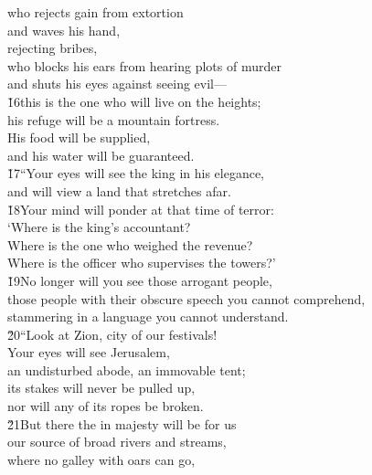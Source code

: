 \begin{poetry}
\poemll    who rejects gain from extortion \\
\poeml and waves his hand, \\
\poemll    rejecting bribes, \\
\poemll    who blocks his ears from hearing plots of murder \\
\poemlll       and shuts his eyes against seeing evil--- \\
\poeml \v{16}this is the one who will live on the heights; \\
\poemll    his refuge will be a mountain fortress. \\
\poeml His food will be supplied, \\
\poemll    and his water will be guaranteed. \\
\poeml \v{17}``Your eyes will see the king in his elegance, \\
\poemll    and will view a land that stretches afar. \\
\poeml \v{18}Your mind will ponder at that time of terror: \\
\poemll    `Where is the king's accountant? \\
\poeml Where is the one who weighed the revenue? \\
\poemll    Where is the officer who supervises the towers?' \\
\poeml \v{19}No longer will you see those arrogant people, \\
\poemll    those people with their obscure speech you cannot comprehend, \\
\poemll    stammering in a language you cannot understand. \\
\poeml \v{20}``Look at Zion, city of our festivals! \\
\poemll    Your eyes will see Jerusalem, \\
\poemlll       an undisturbed abode, an immovable tent; \\
\poeml its stakes will never be pulled up, \\
\poemll    nor will any of its ropes be broken. \\
\poeml \v{21}But there the  in majesty will be for us \\
\poemll    our source of broad rivers and streams, \\
\poeml where no galley with oars can go, \\

\end{poetry}
